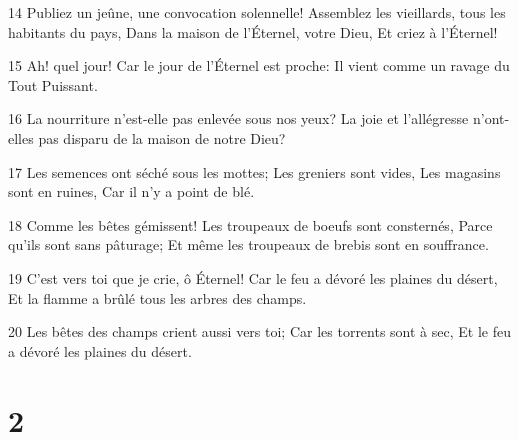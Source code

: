 \par 14 Publiez un jeûne, une convocation solennelle! Assemblez les vieillards, tous les habitants du pays, Dans la maison de l'Éternel, votre Dieu, Et criez à l'Éternel!
\par 15 Ah! quel jour! Car le jour de l'Éternel est proche: Il vient comme un ravage du Tout Puissant.
\par 16 La nourriture n'est-elle pas enlevée sous nos yeux? La joie et l'allégresse n'ont-elles pas disparu de la maison de notre Dieu?
\par 17 Les semences ont séché sous les mottes; Les greniers sont vides, Les magasins sont en ruines, Car il n'y a point de blé.
\par 18 Comme les bêtes gémissent! Les troupeaux de boeufs sont consternés, Parce qu'ils sont sans pâturage; Et même les troupeaux de brebis sont en souffrance.
\par 19 C'est vers toi que je crie, ô Éternel! Car le feu a dévoré les plaines du désert, Et la flamme a brûlé tous les arbres des champs.
\par 20 Les bêtes des champs crient aussi vers toi; Car les torrents sont à sec, Et le feu a dévoré les plaines du désert.

\chapter{2}

